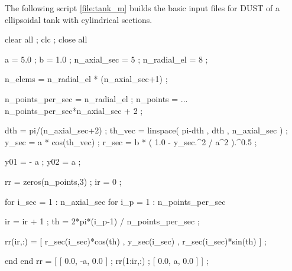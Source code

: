  \noindent
The following script \ref{file:tank_m} builds the basic input files for DUST of a ellipsoidal tank with cylindrical sections.
\begin{inputfile}[frame=single, caption={\opt{tank.m}}, label={file:tank_m}]
%
%
clear all ; clc ; close all

a = 5.0 ; b = 1.0 ; %
n_axial_sec = 5   ; %
n_radial_el = 8   ; %

n_elems = n_radial_el * (n_axial_sec+1) ;

n_points_per_sec = n_radial_el ;
n_points = ...
  n_points_per_sec*n_axial_sec + 2 ; %

dth = pi/(n_axial_sec+2) ;
th_vec = linspace( pi-dth , dth , n_axial_sec ) ;
y_sec = a * cos(th_vec) ; 
r_sec = b * ( 1.0 - y_sec.^2 / a^2 ).^0.5 ;

y01 = - a ; y02 = a ;

rr = zeros(n_points,3) ; ir = 0 ;

for i_sec = 1 : n_axial_sec
  for i_p = 1 : n_points_per_sec

    ir = ir + 1 ;
    th = 2*pi*(i_p-1) / n_points_per_sec ;

    rr(ir,:) = [ r_sec(i_sec)*cos(th) , y_sec(i_sec) , r_sec(i_sec)*sin(th) ] ;

  end
end
rr = [ [ 0.0, -a, 0.0 ] ; rr(1:ir,:) ; [ 0.0, a, 0.0 ] ] ; 


\end{inputfile}

